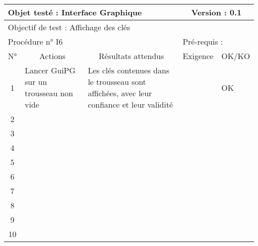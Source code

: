 \documentclass{../res/univ-projet}
\begin{document}
\begin{center}
    \begin{tabular}{|c|p{5cm}|p{5cm}|p{1.5cm}|p{1.5cm}|}
      \hline
      \multicolumn{3}{|l|}{Objet testé : Interface Graphique} & \multicolumn{2}{c|}{Version : 0.1}\\ \hline
      \multicolumn{5}{|l|}{Objectif de test : Affichage des clés}\\ \hline
      \multicolumn{3}{|l|}{Procédure n° I6} & \multicolumn{2}{p{3cm}|}{Pré-requis : }\\ \hline
      \multicolumn{1}{|c|}{N°} & \multicolumn{1}{c|}{Actions} & \multicolumn{1}{c|}{Résultats attendus} & 
      \multicolumn{1}{c|}{Exigence} & \multicolumn{1}{c|}{OK/KO}\\ \hline
      1 & Lancer GuiPG sur un trousseau non vide & Les clés contenues dans le trousseau sont affichées, avec leur confiance et leur validité &  & OK \\
      2 &  &  &  & \\
      3 &  &  &  & \\ 
      4 &  &  &  & \\
      5 &  &  &  & \\
      6 &  &  &  & \\
      7 &  &  &  & \\
      8 &  &  &  & \\
      9 &  &  &  & \\
      10 &  &  &  &\\ 
	\hline
    \end{tabular}
    \vskip 2.2cm


\end{center}
\end{document}
